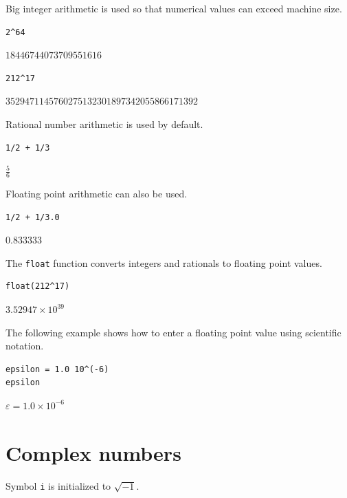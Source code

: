 \documentclass[12pt]{article}
\begin{document}
Big integer arithmetic is used so that numerical values can
exceed machine size.

{\color{blue}
\begin{verbatim}
2^64
\end{verbatim}
}

$\displaystyle 18446744073709551616$

{\color{blue}
\begin{verbatim}
212^17
\end{verbatim}
}

$\displaystyle 3529471145760275132301897342055866171392$

\bigskip

Rational number arithmetic is used by default.

{\color{blue}
\begin{verbatim}
1/2 + 1/3
\end{verbatim}
}

$\displaystyle \tfrac{5}{6}$

\bigskip

Floating point arithmetic can also be used.

{\color{blue}
\begin{verbatim}
1/2 + 1/3.0
\end{verbatim}
}

$\displaystyle 0.833333$

\bigskip
The \verb$float$ function converts integers and rationals to floating point values.

{\color{blue}
\begin{verbatim}
float(212^17)
\end{verbatim}
}

$\displaystyle 3.52947\times10^{39}$

\bigskip
The following example shows how to enter a floating point value
using scientific notation.

{\color{blue}
\begin{verbatim}
epsilon = 1.0 10^(-6)
epsilon
\end{verbatim}
}

$\displaystyle \varepsilon=1.0\times10^{-6}$

\newpage

\section{Complex numbers}

Symbol \verb$i$ is initialized to $\sqrt{-1}$.
\end{document}
